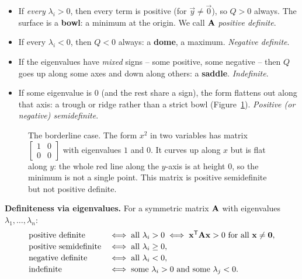 \begin{itemize}
\item If \emph{every} $\lambda_i>0$, then every term is positive (for $\vec{y}\ne
\vec{0}$), so $Q>0$ always. The surface is a \textbf{bowl}: a minimum at the
origin. We call $\mathbf{A}$ \emph{positive definite}.
\item If every $\lambda_i<0$, then $Q<0$ always: a \textbf{dome}, a maximum.
\emph{Negative definite}.
\item If the eigenvalues have \emph{mixed} signs -- some positive, some negative --
then $Q$ goes up along some axes and down along others: a \textbf{saddle}.
\emph{Indefinite}.
\item If some eigenvalue is $0$ (and the rest share a sign), the form flattens out
along that axis: a trough or ridge rather than a strict bowl
(Figure~\ref{ch36:fig-trough}). \emph{Positive (or negative) semidefinite}.
\end{itemize}

\begin{figure}[htbp]
\centering
{}
\caption{The borderline case. The form $x^2$ in two variables has matrix
$\left[\begin{smallmatrix}1&0\\0&0\end{smallmatrix}\right]$ with eigenvalues $1$ and $0$. It
curves up along $x$ but is flat along $y$: the whole red line along the $y$-axis is at
height $0$, so the minimum is not a single point. This matrix is positive semidefinite
but not positive definite.}
\label{ch36:fig-trough}
\end{figure}

\begin{formalbox}
\label{ch36:thm-definiteness}
\textbf{Definiteness via eigenvalues.} For a symmetric matrix $\mathbf{A}$ with eigenvalues $\lambda_1,\dots,\lambda_n$:
\[
\begin{array}{ll}
\text{positive definite} & \iff \text{all } \lambda_i > 0 \iff \mathbf{x}^{\mathsf{T}}\mathbf{A}\mathbf{x} > 0 \text{ for all } \mathbf{x}\ne\mathbf{0},\\[2pt]
\text{positive semidefinite} & \iff \text{all } \lambda_i \ge 0,\\[2pt]
\text{negative definite} & \iff \text{all } \lambda_i < 0,\\[2pt]
\text{indefinite} & \iff \text{some } \lambda_i>0 \text{ and some } \lambda_j<0.
\end{array}
\]
\end{formalbox}

